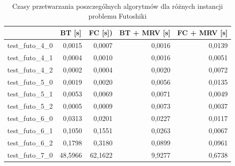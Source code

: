 \documentclass{article}
\begin{document}
	\begin{table}[H]
		\caption{Czasy przetwarzania poszczególnych algorytmów dla różnych instancji problemu Futoshiki}
		\label{tab:times_futo}
		\begin{center}
			\begin{tabular}{|l|r|r|r|r|}
				\hline
				& \multicolumn{1}{c|}{\textbf{BT [s]}} & \multicolumn{1}{c|}{\textbf{FC [s])}} & \multicolumn{1}{c|}{\textbf{BT + MRV [s]}} & \multicolumn{1}{c|}{\textbf{FC + MRV [s]}} \\ \hline
				test\_futo\_4\_0 & 0,0015                           & 0,0007                           & 0,0016                                 & 0,0139                                 \\ \hline
				test\_futo\_4\_1 & 0,0004                           & 0,0010                           & 0,0016                                 & 0,0051                                 \\ \hline
				test\_futo\_4\_2 & 0,0002                           & 0,0004                           & 0,0020                                 & 0,0072                                 \\ \hline
				test\_futo\_5\_0 & 0,0019                           & 0,0020                           & 0,0056                                 & 0,0135                                 \\ \hline
				test\_futo\_5\_1 & 0,0053                           & 0,0069                           & 0,0071                                 & 0,0049                                 \\ \hline
				test\_futo\_5\_2 & 0,0005                           & 0,0009                           & 0,0073                                 & 0,0037                                 \\ \hline
				test\_futo\_6\_0 & 0,0313                           & 0,0201                           & 0,0227                                 & 0,0117                                 \\ \hline
				test\_futo\_6\_1 & 0,1050                           & 0,1551                           & 0,0263                                 & 0,0067                                 \\ \hline
				test\_futo\_6\_2 & 0,1798                           & 0,3180                           & 0,0899                                 & 0,0961                                 \\ \hline
				test\_futo\_7\_0 & 48,5966                          & 62,1622                          & 9,9277                                 & 0,6738                                 \\ \hline

\end{tabular}
\end{center}
\end{table}
\end{document}
